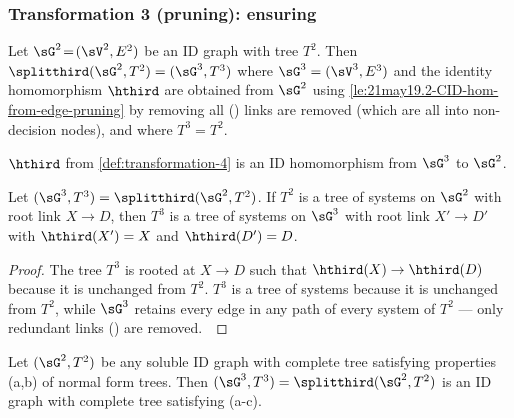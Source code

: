\subsubsection{Transformation 3 (pruning): ensuring \noRedundantLinks}


\begin{definition}[Transformation 3]
\label{def:transformation-4}
Let $\sG^2\!=\!(\sV^2,E^2)$ be an ID graph with tree $T^2$.
Then $\splitthird(\sG^2,T^2)=(\sG^3, T^3)$ 
where $\sG^3=(\sV^3,E^3)$ and the identity homomorphism $\hthird$ are obtained from $\sG^2$ using \autoref{le:21may19.2-CID-hom-from-edge-pruning} by removing 
all  (\noRedundantLinks)
links are removed (which are all into non-decision nodes), and where
$T^3=T^2$.~
\end{definition}

\begin{lemma}
\label{le:transformation-4-is-homomorphic}
$\hthird$ from \autoref{def:transformation-4} is an ID homomorphism from $\sG^3$ to $\sG^2$.
\end{lemma}


\begin{lemma}\label{le:transformation-4-preserves-tree}
Let $(\sG^3, T^3)=\splitthird(\sG^2,T^2)$. If $T^2$ is a tree of systems on $\sG^2$ with root link $X\to D$, then $T^3$ is a tree of systems on $\sG^3$ with root link $X'\to D'$ with $\hthird(X')=X$ and $\hthird(D')=D$.
\end{lemma}

\begin{proof}
The tree $T^3$ is rooted at $X \to D$ 
such that $\hthird(X) \to \hthird(D)$
because it is unchanged from $T^2$.
$T^3$ is 
a tree of systems because it is unchanged from $T^2$, 
while $\sG^3$ retains every edge in any path of every system of $T^2$
--- only redundant links 
 (\noRedundantLinks)
are removed.~
\end{proof}



\begin{lemma}
\label{le:transformation-4-ensures-no-redundant-links}
Let $(\sG^2,T^2)$ be any soluble ID graph with complete tree satisfying properties (a,b) of normal form trees. Then $(\sG^3,T^3)=\splitthird(\sG^2,T^2)$ is an ID graph with complete tree satisfying (a-c).
\end{lemma}


